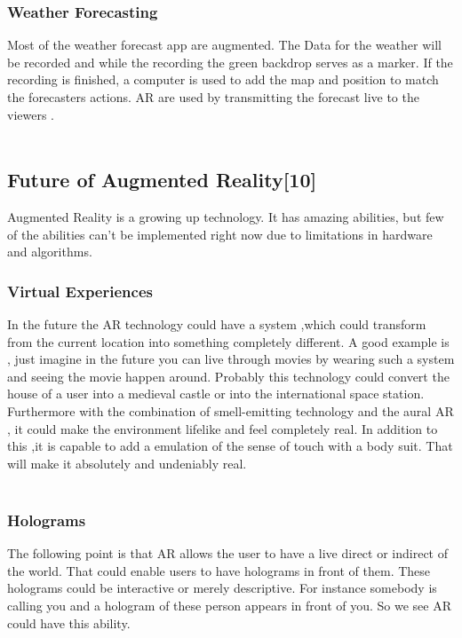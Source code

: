 \subsubsection{Weather Forecasting}
Most of the weather forecast app are augmented. The Data for the weather will be recorded and while the recording  the green backdrop serves as a  marker. If the recording is finished, a computer is used to add the map and position to match the forecasters actions. AR  are used by transmitting the forecast live to the viewers .
\\
\\
\subsection{Future of Augmented Reality[10]}
Augmented Reality is a growing up technology. It has amazing abilities, but few of the abilities can't be implemented right now due to limitations in hardware and algorithms.
\subsubsection{Virtual Experiences}



In the future the AR technology could have a system ,which could transform from the current location into something completely different. A good example is , just imagine in the future you can live through movies by wearing  such a system and seeing the movie happen around. Probably this technology could convert the house of a user into a medieval castle or into the international space station. Furthermore with the combination  of smell-emitting technology and the aural AR , it could make the environment lifelike and  feel completely real. In addition to this ,it is capable to add a emulation of the sense of touch with a body suit. That will make it absolutely and undeniably real. 
\\
\\
\subsubsection{Holograms}
The following point is that AR allows  the user to have a live direct or indirect of the world. That could enable users to have holograms in front of them. These holograms could be interactive or merely descriptive.  For instance somebody is calling you and a hologram of these person appears in front of you. So we see AR could have this ability.

